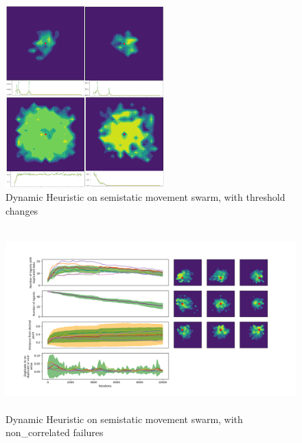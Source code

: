 \documentclass{UoYCSproject}
\begin{document}
\begin{figure}[htb]
\label{fig:Threshold_Changes2}
\begin{center}
\centering
\includegraphics[height=7cm]{"./Dynamic_Heuristic/Thresholdchanges.png"}
\caption{Dynamic Heuristic on semi\-static movement swarm, with threshold changes}
\end{center}
\end{figure}

\begin{figure}[htb]
\label{fig:static_movement_non2}
\begin{center}
\centering
\includegraphics[height=7cm]{"./Dynamic_Heuristic/Static_move_non.png"}
\caption{Dynamic Heuristic on semi\-static movement swarm, with non\_correlated failures}
\end{center}
\end{figure}
\end{document}
